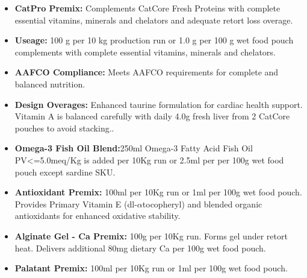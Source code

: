 \vspace{1em}

\begin{itemize}
\item \textbf{CatPro Premix: } Complements CatCore Fresh Proteins with complete essential vitamins, minerals and chelators and adequate retort loss overage.
\item \textbf{Useage:} 100 g per 10 kg production run or 1.0 g per 100 g wet food pouch complements with complete essential vitamins, minerals and chelators. \item\textbf{AAFCO Compliance: } Meets AAFCO requirements for complete and balanced nutrition.
\item\textbf{Design Overages: }Enhanced taurine formulation for cardiac health support. Vitamin A is balanced carefully with daily 4.0g fresh liver from 2 CatCore pouches to avoid stacking.\cite{ref64}.  
\item \textbf{Omega-3 Fish Oil Blend:}250ml Omega-3 Fatty Acid Fish Oil PV<=5.0meq/Kg is added per 10Kg run or 2.5ml per per 100g wet food pouch except sardine SKU.
\item \textbf{Antioxidant Premix: } 100ml per 10Kg run or 1ml per 100g wet food pouch. Provides Primary Vitamin E (dl-$\alpha$tocopheryl) and blended organic antioxidants for enhanced oxidative stability.
\item \textbf{Alginate Gel - Ca Premix:} 100g per 10Kg run. Forms gel under retort heat. Delivers additional 80mg dietary Ca per 100g wet food pouch.
\item \textbf{Palatant Premix: } 100ml per 10Kg run or 1ml per 100g wet food pouch.
\end{itemize}
